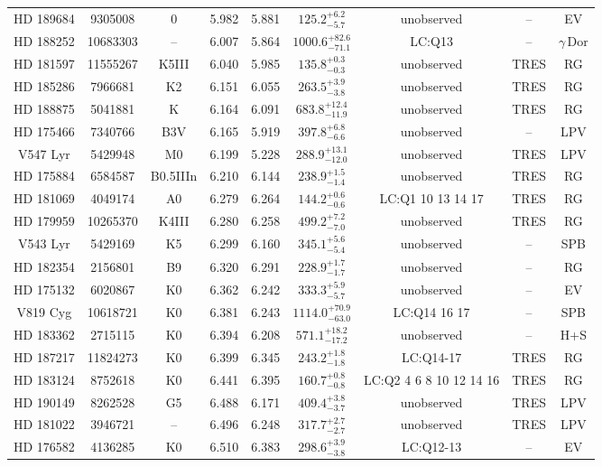 \begin{table*}
\begin{tabular}{ccccccccc}
HD 189684 & 9305008 & 0 & 5.982 & 5.881 & $125.2^{+6.2}_{-5.7}$ & unobserved & -- & EV \\
HD 188252 & 10683303 & -- & 6.007 & 5.864 & $1000.6^{+82.6}_{-71.1}$ & LC:Q13 & -- & $\gamma\,\text{Dor}$ \\
HD 181597 & 11555267 & K5III & 6.040 & 5.985 & $135.8^{+0.3}_{-0.3}$ & unobserved & TRES & RG \\
HD 185286 & 7966681 & K2 & 6.151 & 6.055 & $263.5^{+3.9}_{-3.8}$ & unobserved & TRES & RG \\
HD 188875 & 5041881 & K & 6.164 & 6.091 & $683.8^{+12.4}_{-11.9}$ & unobserved & TRES & RG \\
HD 175466 & 7340766 & B3V & 6.165 & 5.919 & $397.8^{+6.8}_{-6.6}$ & unobserved & -- & LPV \\
V547 Lyr & 5429948 & M0 & 6.199 & 5.228 & $288.9^{+13.1}_{-12.0}$ & unobserved & TRES & LPV \\
HD 175884 & 6584587 & B0.5IIIn & 6.210 & 6.144 & $238.9^{+1.5}_{-1.4}$ & unobserved & TRES & RG \\
HD 181069 & 4049174 & A0 & 6.279 & 6.264 & $144.2^{+0.6}_{-0.6}$ & LC:Q1 10 13 14 17 & TRES & RG \\
HD 179959 & 10265370 & K4III & 6.280 & 6.258 & $499.2^{+7.2}_{-7.0}$ & unobserved & TRES & RG \\
V543 Lyr & 5429169 & K5 & 6.299 & 6.160 & $345.1^{+5.6}_{-5.4}$ & unobserved & -- & SPB \\
HD 182354 & 2156801 & B9 & 6.320 & 6.291 & $228.9^{+1.7}_{-1.7}$ & unobserved & -- & RG \\
HD 175132 & 6020867 & K0 & 6.362 & 6.242 & $333.3^{+5.9}_{-5.7}$ & unobserved & -- & EV \\
V819 Cyg & 10618721 & K0 & 6.381 & 6.243 & $1114.0^{+70.9}_{-63.0}$ & LC:Q14 16 17 & -- & SPB \\
HD 183362 & 2715115 & K0 & 6.394 & 6.208 & $571.1^{+18.2}_{-17.2}$ & unobserved & -- & H+S \\
HD 187217 & 11824273 & K0 & 6.399 & 6.345 & $243.2^{+1.8}_{-1.8}$ & LC:Q14-17 & TRES & RG \\
HD 183124 & 8752618 & K0 & 6.441 & 6.395 & $160.7^{+0.8}_{-0.8}$ & LC:Q2 4 6 8 10 12 14 16 & TRES & RG \\
HD 190149 & 8262528 & G5 & 6.488 & 6.171 & $409.4^{+3.8}_{-3.7}$ & unobserved & TRES & LPV \\
HD 181022 & 3946721 & -- & 6.496 & 6.248 & $317.7^{+2.7}_{-2.7}$ & unobserved & TRES & LPV \\
HD 176582 & 4136285 & K0 & 6.510 & 6.383 & $298.6^{+3.9}_{-3.8}$ & LC:Q12-13 & -- & EV \\

\end{tabular}
\end{table*}
